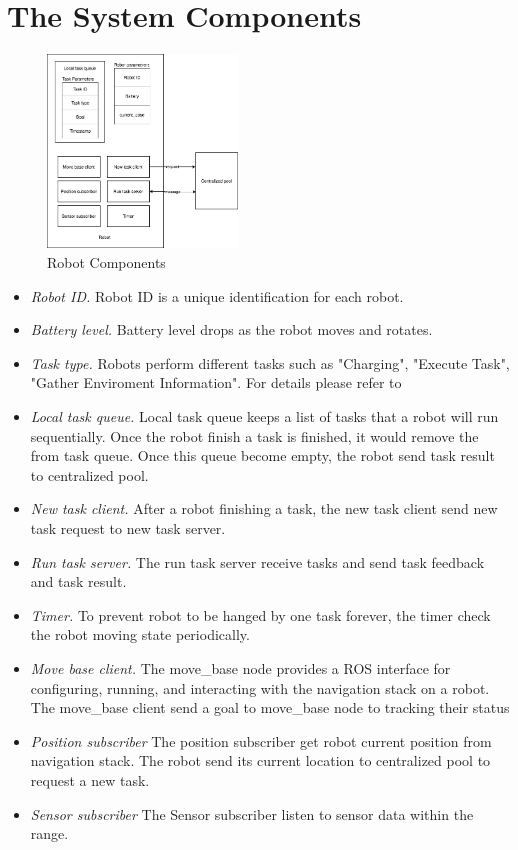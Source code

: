 \section{The System Components}



\begin{figure}[htb]
	\centering
	\includegraphics[width = 0.45\textwidth]{content/images/ch3/system_component_robot.drawio.png}
	\caption{Robot Components}
	\label{fig:robot_components}
\end{figure}

\begin{itemize}
	\item \textsl{Robot ID.} Robot ID is a unique identification for each robot.
	\item \textsl{Battery level.} Battery level drops as the robot moves and rotates.
	\item \textsl{Task type.} Robots perform different tasks such as "Charging", "Execute Task", "Gather Enviroment Information". For details please refer to 
	\item \textsl{Local task queue.} Local task queue keeps a list of tasks that a robot will run sequentially. Once the robot finish a task is finished, it would remove the from task queue. Once this queue become empty, the robot send task result to centralized pool.
	\item \textsl{New task client.} After a robot finishing a task, the new task client send new task request to new task server.
	\item \textsl{Run task server.} The run task server receive tasks and send task feedback and task result.
	\item \textsl{Timer.} To prevent robot to be hanged by one task forever, the timer check the robot moving state periodically.
	\item \textsl{Move base client.} The move\_base node provides a ROS interface for configuring, running, and interacting with the navigation stack on a robot. The move\_base client send a goal to move\_base node to tracking their status  
	\item \textsl{Position subscriber} The position subscriber get robot current position from navigation stack. The robot send its current location to centralized pool to request a new task.
	\item \textsl{Sensor subscriber} The Sensor subscriber listen to sensor data within the range.
\end{itemize}

